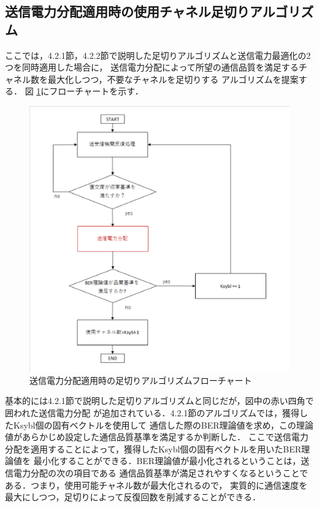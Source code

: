 \subsection{送信電力分配適用時の使用チャネル足切りアルゴリズム}
ここでは，4.2.1節，4.2.2節で説明した足切りアルゴリズムと送信電力最適化の2つを同時適用した場合に，
送信電力分配によって所望の通信品質を満足するチャネル数を最大化しつつ，不要なチャネルを足切りする
アルゴリズムを提案する．
図 \ref{figCombFlow}にフローチャートを示す．
\begin{figure}
    \centering
    \includegraphics[width=0.95\linewidth]{chapter4/figure/CombFlow.eps}
    \caption{送信電力分配適用時の足切りアルゴリズムフローチャート}
    \label{figCombFlow}
\end{figure}
基本的には4.2.1節で説明した足切りアルゴリズムと同じだが，図中の赤い四角で囲われた送信電力分配
が追加されている．4.2.1節のアルゴリズムでは，獲得したKsybl個の固有ベクトルを使用して
通信した際のBER理論値を求め，この理論値があらかじめ設定した通信品質基準を満足するか判断した．
ここで送信電力分配を適用することによって，獲得したKsybl個の固有ベクトルを用いたBER理論値を
最小化することができる．BER理論値が最小化されるということは，送信電力分配の次の項目である
通信品質基準が満足されやすくなるということである．つまり，使用可能チャネル数が最大化されるので，
実質的に通信速度を最大にしつつ，足切りによって反復回数を削減することができる．

